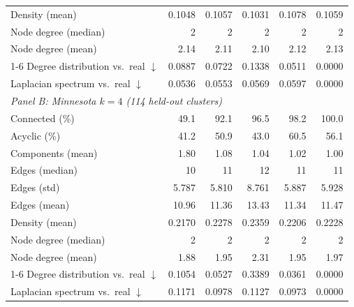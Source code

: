 \begin{table}[H]
\begin{tabular}{lrrrrr}
Density (mean)                             & 0.1048 & 0.1057 & 0.1031 & 0.1078 & 0.1059 \\
Node degree (median)                       & 2      & 2      & 2      & 2      & 2      \\
Node degree (mean)                         & 2.14   & 2.11   & 2.10   & 2.12   & 2.13   \\
\cmidrule(lr){1-6}
Degree distribution vs.\ real $\downarrow$ & 0.0887 & 0.0722 & 0.1338 & 0.0511 & 0.0000 \\
Laplacian spectrum vs.\ real $\downarrow$  & 0.0536 & 0.0553 & 0.0569 & 0.0597 & 0.0000 \\
\midrule
\multicolumn{6}{l}{\emph{Panel B: Minnesota $k = 4$ (114 held-out clusters)}} \\
\midrule
Connected (\%)                             & 49.1   & 92.1   & 96.5   & 98.2   & 100.0  \\
Acyclic (\%)                               & 41.2   & 50.9   & 43.0   & 60.5   & 56.1   \\
Components (mean)                          & 1.80   & 1.08   & 1.04   & 1.02   & 1.00   \\
Edges (median)                             & 10     & 11     & 12     & 11     & 11     \\
Edges (std)                                & 5.787  & 5.810  & 8.761  & 5.887  & 5.928  \\
Edges (mean)                               & 10.96  & 11.36  & 13.43  & 11.34  & 11.47  \\
Density (mean)                             & 0.2170 & 0.2278 & 0.2359 & 0.2206 & 0.2228 \\
Node degree (median)                       & 2      & 2      & 2      & 2      & 2      \\
Node degree (mean)                         & 1.88   & 1.95   & 2.31   & 1.95   & 1.97   \\
\cmidrule(lr){1-6}
Degree distribution vs.\ real $\downarrow$ & 0.1054 & 0.0527 & 0.3389 & 0.0361 & 0.0000 \\
Laplacian spectrum vs.\ real $\downarrow$  & 0.1171 & 0.0978 & 0.1127 & 0.0973 & 0.0000 \\
\bottomrule
\end{tabular}
\end{table}

%
